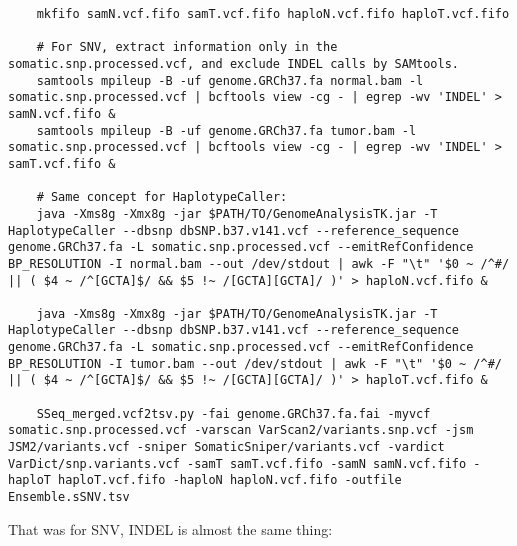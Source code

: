 \documentclass[10pt,letterpaper]{article}
\begin{document}
	\begin{lstlisting}
	mkfifo samN.vcf.fifo samT.vcf.fifo haploN.vcf.fifo haploT.vcf.fifo

	# For SNV, extract information only in the somatic.snp.processed.vcf, and exclude INDEL calls by SAMtools.
	samtools mpileup -B -uf genome.GRCh37.fa normal.bam -l somatic.snp.processed.vcf | bcftools view -cg - | egrep -wv 'INDEL' > samN.vcf.fifo &
	samtools mpileup -B -uf genome.GRCh37.fa tumor.bam -l somatic.snp.processed.vcf | bcftools view -cg - | egrep -wv 'INDEL' > samT.vcf.fifo &

	# Same concept for HaplotypeCaller:
	java -Xms8g -Xmx8g -jar $PATH/TO/GenomeAnalysisTK.jar -T HaplotypeCaller --dbsnp dbSNP.b37.v141.vcf --reference_sequence genome.GRCh37.fa -L somatic.snp.processed.vcf --emitRefConfidence BP_RESOLUTION -I normal.bam --out /dev/stdout | awk -F "\t" '$0 ~ /^#/ || ( $4 ~ /^[GCTA]$/ && $5 !~ /[GCTA][GCTA]/ )' > haploN.vcf.fifo &

	java -Xms8g -Xmx8g -jar $PATH/TO/GenomeAnalysisTK.jar -T HaplotypeCaller --dbsnp dbSNP.b37.v141.vcf --reference_sequence genome.GRCh37.fa -L somatic.snp.processed.vcf --emitRefConfidence BP_RESOLUTION -I tumor.bam --out /dev/stdout | awk -F "\t" '$0 ~ /^#/ || ( $4 ~ /^[GCTA]$/ && $5 !~ /[GCTA][GCTA]/ )' > haploT.vcf.fifo &
		
	SSeq_merged.vcf2tsv.py -fai genome.GRCh37.fa.fai -myvcf somatic.snp.processed.vcf -varscan VarScan2/variants.snp.vcf -jsm JSM2/variants.vcf -sniper SomaticSniper/variants.vcf -vardict VarDict/snp.variants.vcf -samT samT.vcf.fifo -samN samN.vcf.fifo -haploT haploT.vcf.fifo -haploN haploN.vcf.fifo -outfile Ensemble.sSNV.tsv
	\end{lstlisting}


	That was for SNV, INDEL is almost the same thing:
\end{document}
